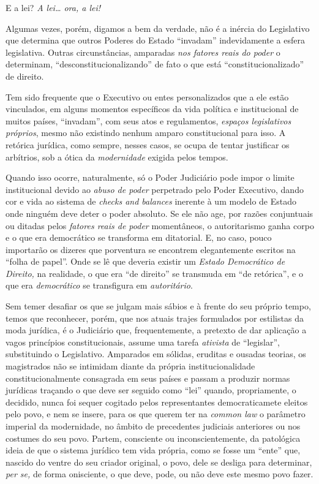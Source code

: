 E a lei? \emph{A lei\ldots{} ora, a lei!}

Algumas vezes, porém, digamos a bem da verdade, não é a inércia do
Legislativo que determina que outros Poderes do Estado
``invadam'' indevidamente a esfera legislativa. Outras
circunstâncias, amparadas \emph{nos fatores reais do poder} o
determinam, ``desconstitucionalizando'' de fato o que está
``constitucionalizado'' de direito.

Tem sido frequente que o Executivo ou entes personalizados que a ele
estão vinculados, em alguns momentos específicos da vida política e
institucional de muitos países, ``invadam'', com seus atos e
regulamentos, \emph{espaços legislativos próprios}, mesmo não existindo
nenhum amparo constitucional para isso. A retórica jurídica, como
sempre, nesses casos, se ocupa de tentar justificar os arbítrios, sob a
ótica da \emph{modernidade} exigida pelos tempos.

Quando isso ocorre, naturalmente, só o Poder Judiciário pode impor o
limite institucional devido ao \emph{abuso de poder} perpetrado pelo
Poder Executivo, dando cor e vida ao sistema de \emph{checks and
balances} inerente à um modelo de Estado onde ninguém deve deter o poder
absoluto. Se ele não age, por razões conjuntuais ou ditadas pelos
\emph{fatores reais de poder} momentâneos, o autoritarismo ganha corpo e
o que era democrático se transforma em ditatorial. E, no caso, pouco
importarão os dizeres que porventura se encontrem elegantemente escritos
na ``folha de papel''. Onde se lê que deveria existir um
\emph{Estado Democrático de Direito,} na realidade, o que era ``de
direito'' se transmuda em ``de retórica'', e o que era
\emph{democrático} se transfigura em \emph{autoritário}.

Sem temer desafiar os que se julgam mais sábios e à frente do seu
próprio tempo, temos que reconhecer, porém, que nos atuais trajes
formulados por estilistas da moda jurídica, é o Judiciário que,
frequentemente, a pretexto de dar aplicação a vagos princípios
constitucionais, assume uma tarefa \emph{ativista} de
``legislar'', substituindo o Legislativo. Amparados em sólidas,
eruditas e ousadas teorias, os magistrados não se intimidam diante da
própria institucionalidade constitucionalmente consagrada em seus países
e passam a produzir normas jurídicas traçando o que deve ser seguido
como ``lei'' quando, propriamente, o decidido, nunca foi sequer
cogitado pelos representantes democraticamete eleitos pelo povo, e nem
se insere, para os que querem ter na \emph{common law} o parâmetro
imperial da modernidade, no âmbito de precedentes judiciais anteriores
ou nos costumes do seu povo. Partem, consciente ou inconscientemente, da
patológica ideia de que o sistema jurídico tem vida própria, como se
fosse um ``ente'' que, nascido do ventre do seu criador original,
o povo, dele se desliga para determinar, \emph{per se,} de forma
onisciente, o que deve, pode, ou não deve este mesmo povo fazer.

